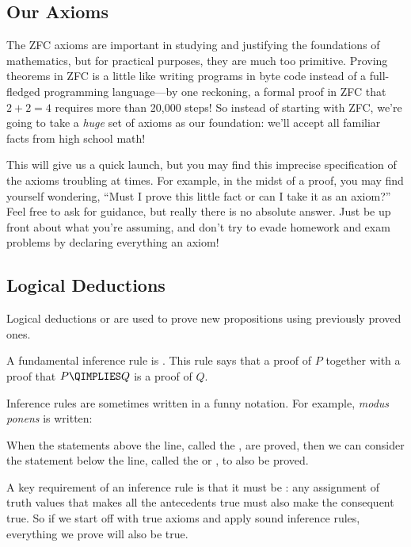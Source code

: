 \subsection{Our Axioms}

The ZFC axioms are important in studying and justifying the foundations of
mathematics, but for practical purposes, they are much too primitive.
Proving theorems in ZFC is a little like writing programs in byte code
instead of a full-fledged programming language---by one reckoning, a
formal proof in ZFC that $2 + 2 = 4$ requires more than 20,000 steps!  So
instead of starting with ZFC, we're going to take a \textit{huge} set of
axioms as our foundation: we'll accept all familiar facts from high school
math!

This will give us a quick launch, but you may find this imprecise
specification of the axioms troubling at times.  For example, in the midst
of a proof, you may find yourself wondering, ``Must I prove this little
fact or can I take it as an axiom?''  Feel free to ask for guidance, but
really there is no absolute answer.  Just be up front about what you're
assuming, and don't try to evade homework and exam problems by declaring
everything an axiom!

\subsection{Logical Deductions}

Logical deductions or  are used to prove new
propositions using previously proved ones.

A fundamental inference rule is .  This rule says that
a proof of $P$ together with a proof that $P \QIMPLIES Q$ is a proof of
$Q$.

Inference rules are sometimes written in a funny notation.  For example,
\emph{modus ponens} is written:
\begin{rul*}
\end{rul*}

When the statements above the line, called the , are
proved, then we can consider the statement below the line, called the
 or , to also be proved.

A key requirement of an inference rule is that it must be : any
assignment of truth values that makes all the antecedents true must also
make the consequent true.  So if we start off with true axioms and apply
sound inference rules, everything we prove will also be true.

